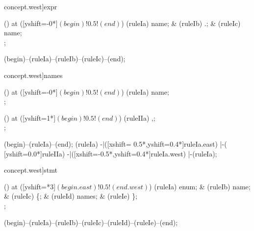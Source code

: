 \begin{syntax}[[xshift=24mm]concept.west]{expr}
  
  \node[sequence] () at ([yshift=-0*\syntaxruledist]$(begin)!0.5!(end)$) {
    \node[nonterminal]    (ruleIa) {name};
    &
    \node[terminal]       (ruleIb) {.};
    &
    \node[nonterminal]    (ruleIc) {name};
    \\
  };
  
  \draw[path] (begin)--(ruleIa)--(ruleIb)--(ruleIc)--(end);
\end{syntax}


\begin{syntax}[[xshift=24mm]concept.west]{names}
  
  \node[sequence] () at ([yshift=-0*\syntaxruledist]$(begin)!0.5!(end)$) {
    \node[nonterminal]    (ruleIa) {name};
    \\
  };
  
  \node[sequence] () at ([yshift=1*\syntaxruledist]$(begin)!0.5!(end)$) {
    \node[terminal]    (ruleIIa) {,};
    \\
  };
  
  \draw[path] (begin)--(ruleIa)--(end);
  \draw[path] (ruleIa)
            -|([xshift= 0.5*\syntaxruledist,yshift=0.4*\syntaxruledist]ruleIa.east)
            |-(                            [yshift=0.0*\syntaxruledist]ruleIIa)
            -|([xshift=-0.5*\syntaxruledist,yshift=0.4*\syntaxruledist]ruleIa.west)
            |-(ruleIa);
\end{syntax}

\begin{syntax}[[xshift=22mm]concept.west]{stmt}
  
  \node[sequence,anchor=north] () at ([yshift=\syntaxrulenodeheight-0.8pt*3]$(begin.east)!0.5!(end.west)$) {
    \node[terminal]    (ruleIa) {enum};
    &
    \node[terminal]    (ruleIb) {name};
    &
    \node[terminal]    (ruleIc) {\{};
    &
    \node[nonterminal] (ruleId) {names};
    &
    \node[terminal]    (ruleIe) {\}};
    \\
  };
  
  \draw[path] (begin)--(ruleIa)--(ruleIb)--(ruleIc)--(ruleId)--(ruleIe)--(end);
\end{syntax}
